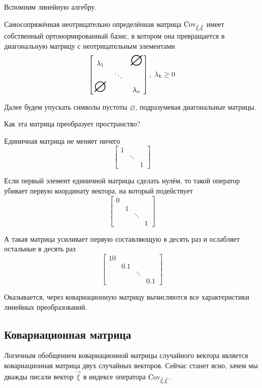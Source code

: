 \begin{remark}\label{remark:linearAlgebra:selfAdjointMatrix}
  Вспомним линейную алгебру.

  Самосопряжённая неотрицательно определённая матрица $\operatorname{Cov^{}_{\vec{\xi}, \vec{\xi}}}$ имеет
  собственный ортонормированный базис, в котором она превращается в
  диагональную матрицу с неотрицательным элементами
  $$\begin{bmatrix}
      \lambda_1 & & \mbox{\Huge{$\varnothing$}} \\
       & \ddots &  \\
       \mbox{\Huge{$\varnothing$}} & & \lambda_n
  \end{bmatrix},\; \lambda_k \ge 0$$

  Далее будем упускать символы пустоты $\varnothing$,
  подразумевая диагональные матрицы.

  Как эта матрица преобразует пространство?

  Единичная матрица не меняет ничего
  $$\begin{bmatrix}
      1 & &\\
      & \ddots & \\
      & & 1
  \end{bmatrix}$$

  Если первый элемент единичной матрицы сделать нулём, то такой оператор
  убивает первую координату вектора, на который подействует
  $$\begin{bmatrix}
      0 & & & \\
      & 1 & & \\
      & & \ddots & \\
      & & & 1
  \end{bmatrix}$$

  А такая матрица усиливает первую составляющую в десять раз и
  ослабляет остальные в десять раз
  $$\begin{bmatrix}
      10 & & &\\
      & 0.1 & & \\
      & & \ddots & \\
      & & & 0.1
  \end{bmatrix}$$

  Оказывается, через ковариационную матрицу вычисляются все характеристики
  линейных преобразований.
\end{remark}

\subsection{Ковариационная матрица}
\label{section:covMatrix}
Логичным обобщением ковариационной матрицы случайного вектора является
ковариационная матрица двух случайных векторов. Сейчас станет ясно, зачем мы
дважды писали вектор $\vec{\xi}$ в индексе оператора $\operatorname{Cov^{}_{\vec{\xi}, \vec{\xi}}}$.


